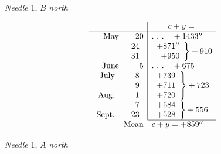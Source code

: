 \begin{center}\textit{Needle} 1, $B$ \textit{north}\end{center}
\[
\begin{array}{rr|l}
&&\qquad c+y=\\\hline
\text{May}&20&.\ .\ .\quad+1433''\\
&\begin{array}{r}24\\31\end{array}&\left.\begin{array}{r}+871''\\+950\end{array}\right\}+910\\
\text{June}&5&.\ .\ .\quad+675\\
\begin{array}{r}\text{July}\\\phantom{\text{July}}\\\text{Aug.}\end{array}&\begin{array}{r}8\\9\\1\end{array}&\left.\begin{array}{r}+739\\+711\\+720\end{array}\right\}+723\\
\begin{array}{r}\phantom{\text{Aug.}}\\\text{Sept.}\end{array}&\begin{array}{r}7\\23\end{array}&\left.\begin{array}{r}+584\\+528\end{array}\right\}+556\\\cline{3-3}
\multicolumn{2}{r}{\text{Mean}}&c+y=+859''
\end{array}
\]
\begin{center}\textit{Needle} 1, $A$ \textit{north}\end{center}
